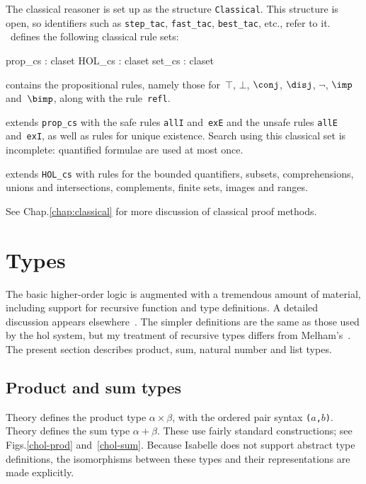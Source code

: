 The classical reasoner is set up as the structure
{\tt Classical}.  This structure is open, so {\ML} identifiers such
as {\tt step_tac}, {\tt fast_tac}, {\tt best_tac}, etc., refer to it.
\HOL\ defines the following classical rule sets:
\begin{ttbox} 
prop_cs    : claset
HOL_cs     : claset
set_cs     : claset
\end{ttbox}
\begin{ttdescription}
\item[\ttindexbold{prop_cs}] contains the propositional rules, namely
those for~$\top$, $\bot$, $\conj$, $\disj$, $\neg$, $\imp$ and~$\bimp$,
along with the rule~{\tt refl}.

\item[\ttindexbold{HOL_cs}] extends {\tt prop_cs} with the safe rules
  {\tt allI} and~{\tt exE} and the unsafe rules {\tt allE}
  and~{\tt exI}, as well as rules for unique existence.  Search using
  this classical set is incomplete: quantified formulae are used at most
  once.

\item[\ttindexbold{set_cs}] extends {\tt HOL_cs} with rules for the bounded
  quantifiers, subsets, comprehensions, unions and intersections,
  complements, finite sets, images and ranges.
\end{ttdescription}
\noindent
See %
        {Chap.\ts\ref{chap:classical}} 
for more discussion of classical proof methods.


\section{Types}
The basic higher-order logic is augmented with a tremendous amount of
material, including support for recursive function and type definitions.  A
detailed discussion appears elsewhere~\cite{paulson-coind}.  The simpler
definitions are the same as those used by the {\sc hol} system, but my
treatment of recursive types differs from Melham's~\cite{melham89}.  The
present section describes product, sum, natural number and list types.

\subsection{Product and sum types}
Theory  defines the product type $\alpha\times\beta$, with
the ordered pair syntax {\tt($a$,$b$)}.  Theory  defines the
sum type $\alpha+\beta$.  These use fairly standard constructions; see
Figs.\ts\ref{chol-prod} and~\ref{chol-sum}.  Because Isabelle does not
support abstract type definitions, the isomorphisms between these types and
their representations are made explicitly.

